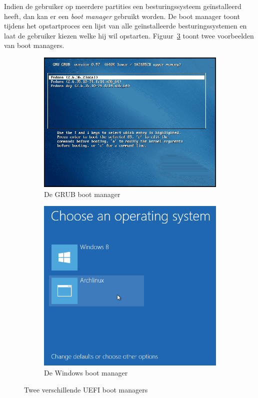 Indien de gebruiker op meerdere partities een besturingssysteem ge\"installeerd heeft, dan kan er een
\emph{boot manager} gebruikt worden. De boot manager toont tijdens het opstartproces een lijst van alle
ge\"installeerde besturingssystemen en laat de gebruiker kiezen welke hij wil opstarten. Figuur~\ref{fig:bootloaders}
toont twee voorbeelden van boot managers.

\begin{figure}
\centering
\begin{subfigure}{.5\textwidth}
  \centering
  \includegraphics[width=.95\linewidth]{images/grubbl.png}
  \caption{De GRUB boot manager}
  \label{fig:grubnl}
\end{subfigure}%
\begin{subfigure}{.5\textwidth}
  \centering
  \includegraphics[width=.95\linewidth]{images/wbl.png}
  \caption{De Windows boot manager}
  \label{fig:wbl}
\end{subfigure}
\caption{Twee verschillende UEFI boot managers}
\label{fig:bootloaders}
\end{figure}

